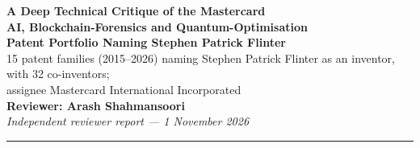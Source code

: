 \documentclass[10pt,a4paper]{article}
\begin{document}
\begin{center}
{\LARGE\bfseries A Deep Technical Critique of the Mastercard}\\[4pt]
{\Large\bfseries AI, Blockchain-Forensics and Quantum-Optimisation}\\[2pt]
{\Large\bfseries Patent Portfolio Naming Stephen Patrick Flinter}\\[6pt]
{\normalsize 15 patent families (2015--2026) naming Stephen Patrick Flinter as an inventor, with 32 co-inventors;\\ assignee Mastercard International Incorporated}\\[4pt]
{\large\bfseries Reviewer: Arash Shahmansoori}\\[3pt]
{\normalsize\itshape Independent reviewer report --- 1 November 2026}
\end{center}

\vspace{2pt}
\noindent\rule{\textwidth}{0.4pt}
\end{document}
